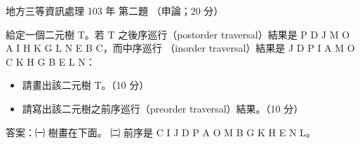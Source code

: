 \begin{pastexam}[label={px:df3-103-ds-02}]{地方三等資訊處理 103 年 第二題}
（申論；20 分）

給定一個二元樹 T。若 T 之後序巡行（postorder traversal）結果是 P D J M O A I H K G L N E B C，而中序巡行
（inorder traversal）結果是 J D P I A M O C K H G B E L N：
\begin{itemize}[leftmargin=2.2em, nosep]
\item[㈠] 請畫出該二元樹 T。（10 分）
\item[㈡] 請寫出該二元樹之前序巡行（preorder traversal）結果。（10 分）
\end{itemize}
\end{pastexam}

\begin{pastsoln}
答案：㈠ 樹畫在下面。 ㈡ 前序是 C I J D P A O M B G K H E N L。


\end{pastsoln}
